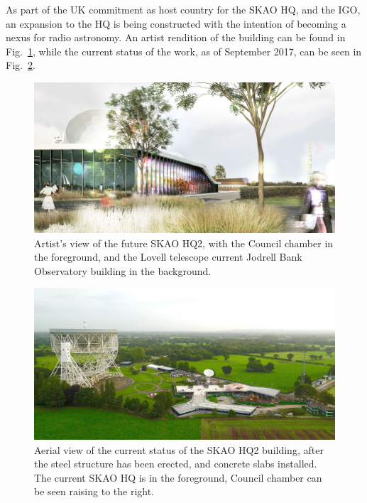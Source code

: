 \documentclass[a4paper,
               biblatex,       %
               keeplastbox,    %
               ]{jacow-2_1}    %
\begin{document}
As part of the UK commitment as host country for the SKAO HQ, and the IGO, an expansion to the HQ is being constructed with the intention of becoming a nexus for radio astronomy. An artist rendition of the building can be found in Fig.~\ref{fig:SKA-HQ-render}, while the current status of the work, as of September 2017, can be seen in Fig.~\ref{fig:SKA-HQ2-aerial}.

\begin{figure}[!htb]
  \centering
    \includegraphics[width=\columnwidth]{SKA-HQ-render.jpg}
  \caption{Artist's view of the future SKAO HQ2, with the Council chamber in the foreground, and the Lovell telescope current Jodrell Bank Observatory building in the background.}
  \label{fig:SKA-HQ-render}
\end{figure}

\begin{figure}[!htb]
  \centering
    \includegraphics[width=\columnwidth]{SKA-HQ2-aerial.jpg}
  \caption{Aerial view of the current status of the SKAO HQ2 building, after the steel structure has been erected, and concrete slabs installed. The current SKAO HQ is in the foreground, Council chamber can be seen raising to the right.}
  \label{fig:SKA-HQ2-aerial}
\end{figure}
\end{document}
